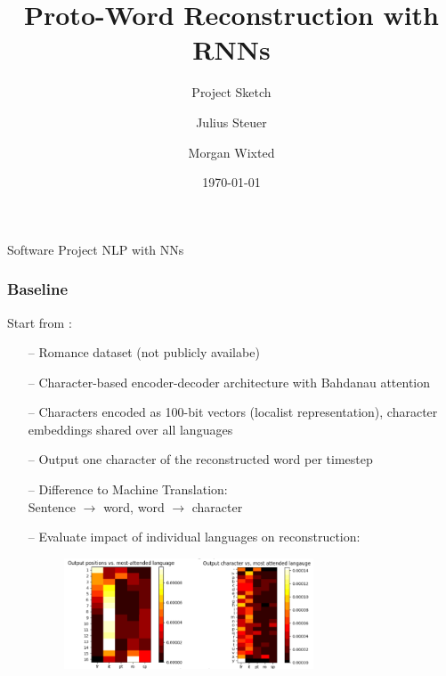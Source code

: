 \documentclass[10pt]{beamer}
\title{Proto-Word Reconstruction with RNNs}
\subtitle{Project Sketch}
\date{\today}
\author{Julius Steuer \and Morgan Wixted}
\begin{document}
\begin{frame}[plain]
    \small
    Software Project NLP with NNs
    \normalsize
    \titlepage
\end{frame}

\begin{frame}
    \frametitle{Baseline}
    Start from \cite{meloni_ab_2019}: 
    \begin{itemize}
        \item[--] Romance dataset (not publicly availabe)
        \item[--] Character-based encoder-decoder architecture with Bahdanau attention
        \item[--] Characters encoded as 100-bit vectors (localist representation), character embeddings shared over all languages
        \item[--] Output one character of the reconstructed word per timestep 
        \item[--] Difference to Machine Translation: \\ 
        \quad Sentence $\rightarrow$ word, word $\rightarrow$ character
        \item[--] Evaluate impact of individual languages on reconstruction:
        \newline
        \begin{figure}[htp]
            \centering
            \includegraphics[width=0.7\textwidth]{graphics/meloni_figure_4.png} 
        \end{figure}
    \end{itemize}
\end{frame}
\end{document}
